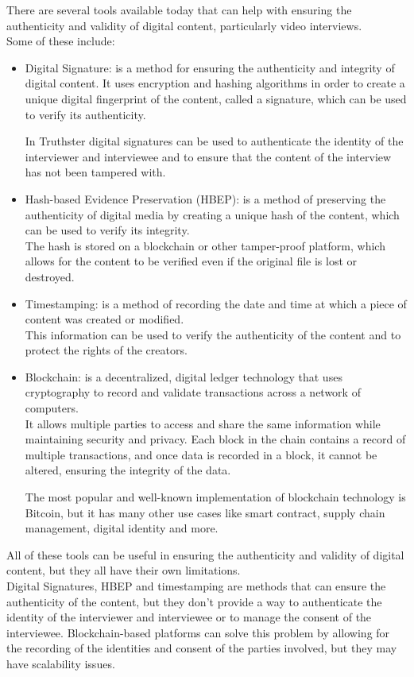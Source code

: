 \documentclass[target=mst,aauheader=]{thud}
\begin{document}
There are several tools available today that can help with ensuring the authenticity and validity of digital content, particularly video interviews.\\
Some of these include:
\begin{itemize}

\item Digital Signature: is a method for ensuring the authenticity and integrity of digital content. It uses encryption and hashing algorithms in order to create a unique digital fingerprint of the content, called a signature, which can be used to verify its authenticity.

In Truthster digital signatures can be used to authenticate the identity of the interviewer and interviewee and to ensure that the content of the interview has not been tampered with.

\item Hash-based Evidence Preservation (HBEP): is a method of preserving the authenticity of digital media by creating a unique hash of the content, which can be used to verify its integrity.\\
The hash is stored on a blockchain or other tamper-proof platform, which allows for the content to be verified even if the original file is lost or destroyed.

\item Timestamping: is a method of recording the date and time at which a piece of content was created or modified.\\
This information can be used to verify the authenticity of the content and to protect the rights of the creators.

\item Blockchain: is a decentralized, digital ledger technology that uses cryptography to record and validate transactions across a network of computers.\\
It allows multiple parties to access and share the same information while maintaining security and privacy. Each block in the chain contains a record of multiple transactions, and once data is recorded in a block, it cannot be altered, ensuring the integrity of the data.

The most popular and well-known implementation of blockchain technology is Bitcoin, but it has many other use cases like smart contract, supply chain management, digital identity and more.

\end{itemize}

All of these tools can be useful in ensuring the authenticity and validity of digital content, but they all have their own limitations.\\
Digital Signatures, HBEP and timestamping are methods that can ensure the authenticity of the content, but they don't provide a way to authenticate the identity of the interviewer and interviewee or to manage the consent of the interviewee. Blockchain-based platforms can solve this problem by allowing for the recording of the identities and consent of the parties involved, but they may have scalability issues.\\
\end{document}
